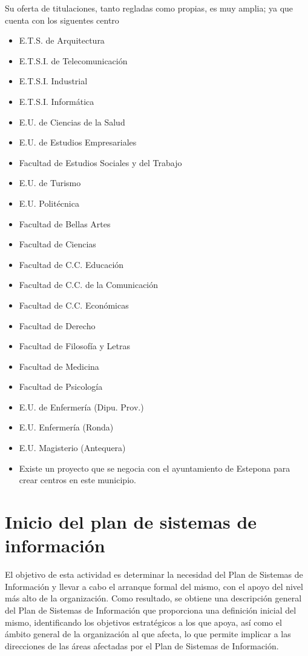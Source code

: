 \documentclass[12pt,a4paper,spanish,twoside]{book}
\begin{document}
Su oferta de titulaciones, tanto regladas como propias, es muy amplia; ya que 
cuenta con los siguentes centro
\begin{itemize}
  \item E.T.S. de Arquitectura
  \item E.T.S.I. de Telecomunicación
  \item E.T.S.I. Industrial
  \item E.T.S.I. Informática
  \item E.U. de Ciencias de la Salud
  \item E.U. de Estudios Empresariales
  \item Facultad de Estudios Sociales y del Trabajo
  \item E.U. de Turismo
  \item E.U. Politécnica
  \item Facultad de Bellas Artes
  \item Facultad de Ciencias
  \item Facultad de C.C. Educación
  \item Facultad de C.C. de la Comunicación
  \item Facultad de C.C. Económicas
  \item Facultad de Derecho
  \item Facultad de Filosofía y Letras
  \item Facultad de Medicina
  \item Facultad de Psicología
  \item E.U. de Enfermería (Dipu. Prov.)
  \item E.U. Enfermería (Ronda)
  \item E.U. Magisterio (Antequera)
  \item Existe un proyecto que se negocia con el ayuntamiento de Estepona para 
      crear centros en este municipio.
\end{itemize}

\chapter{Inicio del plan de sistemas de información}
El objetivo de esta actividad es determinar la necesidad del Plan de Sistemas  
de Información y llevar a cabo el arranque formal del mismo, con el apoyo del
nivel más alto de la organización. Como resultado, se obtiene una descripción
general del Plan de Sistemas de Información que proporciona una definición
inicial del mismo, identificando los objetivos estratégicos a los que apoya,
así como el ámbito general de la organización al que afecta, lo que permite
implicar a las direcciones de las áreas afectadas por el Plan de Sistemas de
Información. 
\end{document}
